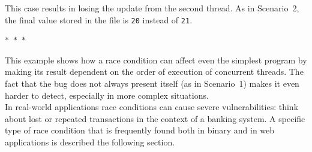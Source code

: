 This case results in losing the update from the second thread. As in Scenario~2, the final value stored in the file is \texttt{20} instead of \texttt{21}.

\begin{center}
  $\ast$~$\ast$~$\ast$
\end{center}

This example shows how a race condition can affect even the simplest program by making its result dependent on the order of execution of concurrent threads. The fact that the bug does not always present itself (as in Scenario~1) makes it even harder to detect, especially in more complex situations. \\

In real-world applications race conditions can cause severe vulnerabilities: think about lost or repeated transactions in the context of a banking system. A specific type of race condition that is frequently found both in binary and in web applications is described the following section.
